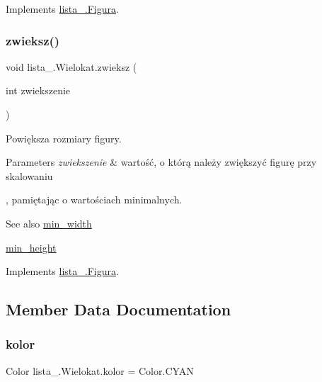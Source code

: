 Implements \mbox{\hyperlink{interfacelista__5_1_1_figura_aeb0982dc44348dd1fde9266d9d476ed0}{lista\+\_.\+Figura}}.

\mbox{\label{classlista__5_1_1_wielokat_a17cfc98331e2a135886070a4094ac0e6}} 
\subsubsection{\texorpdfstring{zwieksz()}{zwieksz()}}
{\footnotesize\ttfamily void lista\+\_.\+Wielokat.\+zwieksz (\begin{DoxyParamCaption}\item[{int}]{zwiekszenie }\end{DoxyParamCaption})}

Powiększa rozmiary figury. 
\begin{DoxyParams}{Parameters}
{\em zwiekszenie} & wartość, o którą należy zwiększyć figurę przy skalowaniu\\
\hline
\end{DoxyParams}
, pamiętając o wartościach minimalnych. \begin{DoxySeeAlso}{See also}
\mbox{\hyperlink{classlista__5_1_1_wielokat_a362cfa49edf4875e534bb1f95a59e7af}{min\+\_\+width}} 

\mbox{\hyperlink{classlista__5_1_1_wielokat_a0aa7a67f7c10f26e3bf9f4444e5ecb65}{min\+\_\+height}} 
\end{DoxySeeAlso}


Implements \mbox{\hyperlink{interfacelista__5_1_1_figura_a6813d7ac31e5118bcb34b9b29868ce5f}{lista\+\_.\+Figura}}.



\subsection{Member Data Documentation}
\mbox{\label{classlista__5_1_1_wielokat_a6804efa88b78068f50c71ba760dcccc5}} 
\subsubsection{\texorpdfstring{kolor}{kolor}}
{\footnotesize\ttfamily Color lista\+\_.\+Wielokat.\+kolor = Color.\+C\+Y\+AN\hspace{0.3cm}{\ttfamily [private]}}



